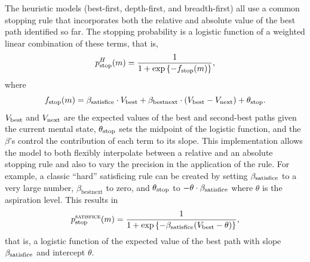 The heuristic models (best-first, depth-first, and breadth-first) all use a common stopping rule that incorporates both the relative and absolute value of the best path identified so far. The stopping probability is a logistic function of a weighted linear combination of these terms, that is,
\begin{equation}\label{eq:stopH}
p_{\mathrm{stop}}^H(m) = \frac{1}{1 + \exp\left\{-f_{\mathrm{stop}}(m)\right\}},
\end{equation}
where
\begin{equation}\label{eq:fstop}
f_{\mathrm{stop}}(m) = 
  \beta_{\mathrm{satisfice}}\cdot V_{\mathrm{best}} +
  \beta_{\mathrm{bestnext}}\cdot (V_{\mathrm{best}} - V_{\mathrm{next}} ) +
  \theta_{\mathrm{stop}}.
\end{equation}
$V_{\mathrm{best}}$ and $V_{\mathrm{next}}$ are the expected values of the best and second-best paths given the current mental state, $\theta_{\mathrm{stop}}$ sets the midpoint of the logistic function, and the $\beta$'s control the contribution of each term to its slope. This implementation allows the model to both flexibly interpolate between a relative and an absolute stopping rule and also to vary the precision in the application of the rule. For example, a classic ``hard'' satisficing rule can be created by setting $\beta_{\mathrm{satisfice}}$ to a very large number, $\beta_{\mathrm{bestnext}}$ to zero, and $\theta_{\mathrm{stop}}$ to $-\theta \cdot\beta_{\mathrm{satisfice}}$ where $\theta$ is the aspiration level. This results in
\begin{equation}\label{eq:satisfice}
p_{\mathrm{stop}}^\textsc{satisfice}(m) = \frac{1}{1 + \exp\left\{-\beta_{\mathrm{satisfice}} (V_{\mathrm{best}} - \theta)\right\}},
\end{equation}
that is, a logistic function of the expected value of the best path with slope $\beta_{\mathrm{satisfice}}$ and intercept $\theta$.

